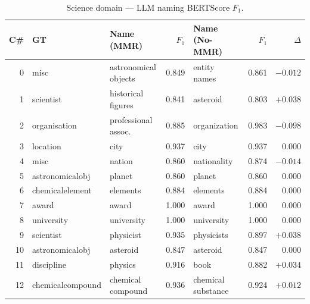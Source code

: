 \documentclass[11pt,a4paper]{article}
\begin{document}
\begin{table}[h]
\centering
\caption{Science domain --- LLM naming BERTScore $F_1$.}
\label{tab:sci}
\small
\setlength{\tabcolsep}{4pt}
\begin{tabular}{r l l r l r r}
\toprule
\textbf{C\#} & \textbf{GT} &
  \textbf{Name (MMR)} & \textbf{$F_1$} &
  \textbf{Name (No-MMR)} & \textbf{$F_1$} &
  \textbf{$\Delta$} \\
\midrule
0  & misc             & astronomical objects   & \cellcolor{red!15}0.849 & entity names          & \cellcolor{red!15}0.861 & $-0.012$ \\
1  & scientist        & historical figures     & \cellcolor{red!15}0.841 & asteroid              & \cellcolor{red!15}0.803 & $+0.038$ \\
2  & organisation     & professional assoc.    & \cellcolor{red!15}0.885 & organization          & \cellcolor{yellow!25}0.983 & $-0.098$ \\
3  & location         & city                   & \cellcolor{yellow!25}0.937 & city                 & \cellcolor{yellow!25}0.937 & $0.000$ \\
4  & misc             & nation                 & \cellcolor{red!15}0.860 & nationality           & \cellcolor{red!15}0.874 & $-0.014$ \\
5  & astronomicalobj  & planet                 & \cellcolor{red!15}0.860 & planet                & \cellcolor{red!15}0.860 & $0.000$ \\
6  & chemicalelement  & elements               & \cellcolor{red!15}0.884 & elements              & \cellcolor{red!15}0.884 & $0.000$ \\
7  & award            & award                  & \cellcolor{green!15}1.000 & award               & \cellcolor{green!15}1.000 & $0.000$ \\
8  & university       & university             & \cellcolor{green!15}1.000 & university           & \cellcolor{green!15}1.000 & $0.000$ \\
9  & scientist        & physicist              & \cellcolor{yellow!25}0.935 & physicists           & \cellcolor{red!15}0.897 & $+0.038$ \\
10 & astronomicalobj  & asteroid               & \cellcolor{red!15}0.847 & asteroid              & \cellcolor{red!15}0.847 & $0.000$ \\
11 & discipline       & physics                & \cellcolor{yellow!25}0.916 & book                 & \cellcolor{red!15}0.882 & $+0.034$ \\
12 & chemicalcompound & chemical compound      & \cellcolor{yellow!25}0.936 & chemical substance   & \cellcolor{yellow!25}0.924 & $+0.012$ \\

\end{tabular}
\end{table}
\end{document}
